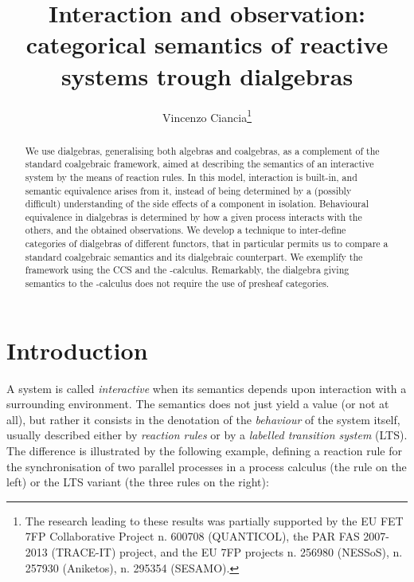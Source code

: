 \documentclass[orivec]{llncs}
\begin{document}
\title{Interaction and observation: categorical semantics of reactive systems trough dialgebras}
\author{Vincenzo Ciancia\thanks{The research leading to these results was partially supported by
the EU FET 7FP Collaborative Project n. 600708 (QUANTICOL), the PAR FAS 2007-2013 (TRACE-IT) project, and the EU 7FP
projects n. 256980 (NESSoS), n. 257930 (Aniketos), n. 295354 (SESAMO).} }
\maketitle
\begin{abstract}
We use dialgebras, generalising both algebras and coalgebras, as a complement of the standard coalgebraic framework, aimed at describing the semantics of an interactive system by the means of reaction rules. In this model, interaction is built-in, and semantic equivalence arises from it, instead of being determined by a (possibly difficult) understanding of the side effects of a component in isolation. Behavioural equivalence in dialgebras is determined by how a given process interacts with the others, and the obtained observations. We develop a technique to inter-define categories of dialgebras of different functors, that in particular permits us to compare a standard coalgebraic semantics and its dialgebraic counterpart. We exemplify the framework using the CCS and the -calculus. Remarkably, the dialgebra giving semantics to the -calculus does not require the use of presheaf categories.
\end{abstract}

\section{Introduction}

A system is called \emph{interactive} when its semantics depends upon interaction with a surrounding environment. The semantics does not just yield a value (or not at all), but rather it consists in the denotation of the \emph{behaviour} of the system itself, usually described either by \emph{reaction rules} or by a \emph{labelled transition system} (LTS). The difference is illustrated by the following example, defining a reaction rule for the synchronisation of two parallel processes in a process calculus (the rule on the left) or the LTS  variant (the three rules on the right):
\end{document}
